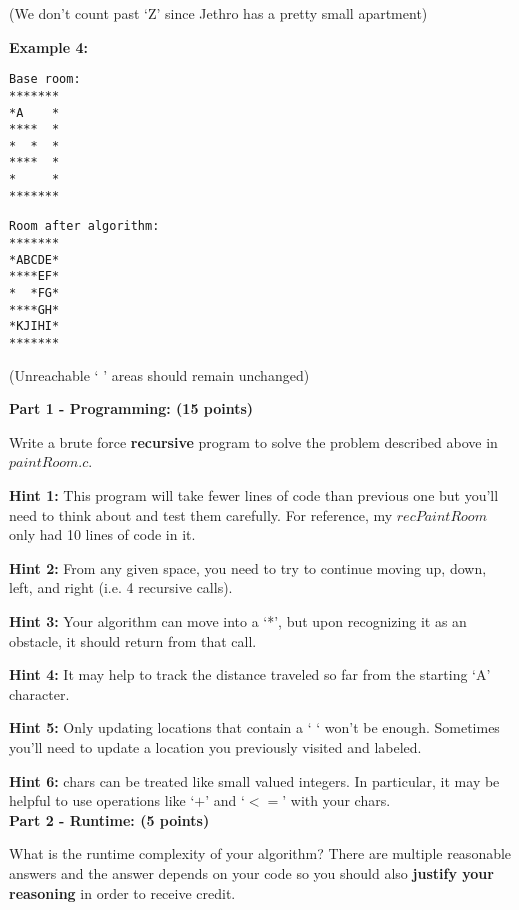 \documentclass[12pt]{elsart}
\begin{document}
(We don't count past `Z' since Jethro has a pretty small apartment)

\vfill

{\bf Example 4: }

\begin{minipage}[t]{0.5\textwidth}
{\small
\begin{verbatim}
Base room:
*******
*A    *
****  *
*  *  *
****  *
*     *
*******
\end{verbatim}
}
\end{minipage}
\begin{minipage}[t]{0.5\textwidth}
{\small
\begin{verbatim}
Room after algorithm:
*******
*ABCDE*
****EF*
*  *FG*
****GH*
*KJIHI*
*******
\end{verbatim}
}
\end{minipage}

(Unreachable ` ' areas should remain unchanged)

\vfill

\newpage

{\bf Part 1 - Programming: (15 points)}

Write a brute force {\bf recursive} program to solve the problem described above in $paintRoom.c$.  

{\bf Hint 1:} This program will take fewer lines of code than previous one but you'll need to think about and test them carefully.  For reference, my $recPaintRoom$ only had 10 lines of code in it.

{\bf Hint 2:} From any given space, you need to try to continue moving up, down, left, and right (i.e. 4 recursive calls).

{\bf Hint 3:} Your algorithm can move into a `*', but upon recognizing it as an obstacle, it should return from that call.

{\bf Hint 4:} It may help to track the distance traveled so far from the starting `A' character.

{\bf Hint 5:} Only updating locations that contain a ` ` won't be enough.  Sometimes you'll need to update a location you previously visited and labeled.

{\bf Hint 6:} chars can be treated like small valued integers.  In particular, it may be helpful to use operations like `$+$' and `$<=$' with your chars.\\


{\bf Part 2 - Runtime: (5 points)}

What is the runtime complexity of your algorithm?  There are multiple reasonable answers and the answer depends on your code so you should also {\bf justify your reasoning} in order to receive credit.\\
\end{document}
